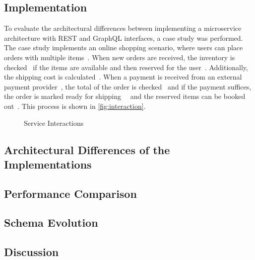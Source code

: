 \subsection{Implementation}

To evaluate the architectural differences between implementing a microservice architecture with REST and GraphQL interfaces, a case study was performed.
The case study implements an online shopping scenario, where users can place orders with multiple items~\raisebox{.5pt}{\textcircled{\raisebox{-.9pt} {1}}}.
When new orders are received, the inventory is checked~\raisebox{.5pt}{\textcircled{\raisebox{-.9pt} {2}}} if the items are available and then reserved for the user~\raisebox{.5pt}{\textcircled{\raisebox{-.9pt} {3}}}.
Additionally, the shipping cost is calculated~\raisebox{.5pt}{\textcircled{\raisebox{-.9pt} {4}}}.
When a payment is received from an external payment provider~\raisebox{.5pt}{\textcircled{\raisebox{-.9pt} {5}}}, the total of the order is checked~\raisebox{.5pt}{\textcircled{\raisebox{-.9pt} {6}}} and if the payment suffices, the order is marked ready for shipping~\raisebox{.5pt}{\textcircled{\raisebox{-.9pt} {7}}}~\raisebox{.5pt}{\textcircled{\raisebox{-.9pt} {8}}} and the reserved items can be booked out~\raisebox{.5pt}{\textcircled{\raisebox{-.9pt} {9}}}.
This process is shown in \autoref{fig:interaction}.

\begin{figure}[!htb]
    \centering
    
    \caption{Service Interactions}
    \label{fig:interaction}
\end{figure}

\subsection{Architectural Differences of the Implementations}

\subsection{Performance Comparison}

\subsection{Schema Evolution}

\subsection{Discussion}